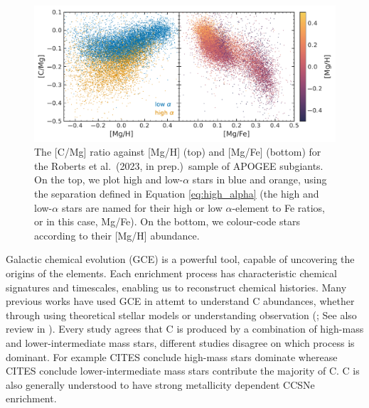\documentclass[fleqn,
usenatbib]{mnras}
\newcommand{\citetjack}{Roberts et al.~(2023, in prep.)}
\newcommand{\apogee}{APOGEE}
\newcommand{\gce}{GCE}
\newcommand{\lims}{lower-intermediate mass stars}
\newcommand{\hms}{high-mass stars}
\begin{document}
\begin{figure}
    \centering
    \includegraphics{subgiants.pdf}
    \caption{The [C/Mg] ratio against [Mg/H] (top) and [Mg/Fe] (bottom) for the \citetjack~sample of \apogee{} subgiants. On the top, we plot high and low-$\alpha$ stars in blue and orange, using the separation defined in Equation \ref{eq:high_alpha} (the high and low-$\alpha$ stars are named for their high or low $\alpha$-element to Fe ratios, or in this case, Mg/Fe). On the bottom, we colour-code stars according to their [Mg/H] abundance.} \label{fig:subgiants}
\end{figure}



Galactic chemical evolution (\gce) is a powerful tool, capable of uncovering the origins of the elements. 
Each enrichment process has characteristic chemical signatures and timescales, enabling us to reconstruct chemical histories.
Many previous works have used GCE in attemt to understand C abundances, whether through using theoretical stellar models \citep{DTS78, prantzos+18, chiappini+03} 
or understanding  observation (\citealt{tinsley79, HEK00, BF06, rybizki+17, berg+19, KKL20};
See also review in \citealt{romano22}).
%
Every study agrees that C is produced by a combination of high-mass and \lims{}, different studies disagree on which process is dominant. 
For example CITES conclude \hms{} dominate wherease CITES conclude \lims{} contribute the majority of C.
C is also generally understood to have strong metallicity dependent CCSNe enrichment. 
\end{document}
